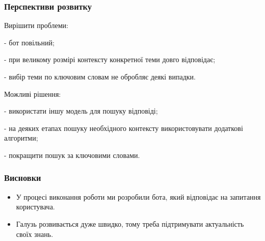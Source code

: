 \documentclass{beamer}
\begin{document}
\begin{frame}
    \frametitle{Перспективи розвитку}
    Вирішити проблеми:

    - бот повільний;

    - при великому розмірі контексту конкретної теми довго відповідає;

    - вибір теми по ключовим словам не обробляє деякі випадки.

    Можливі рішення:
    
    - використати іншу модель для пошуку відповіді;

    - на деяких етапах пошуку необхідного контексту використовувати додаткові алгоритми;

    - покращити пошук за ключовими словами.
\end{frame}

\begin{frame}
    \frametitle{Висновки}

    \begin{itemize}
        \item У процесі виконання роботи ми розробили бота, який відповідає на запитання користувача.
        \item Галузь розвивається дуже швидко, тому треба підтримувати актуальність своїх знань.
    \end{itemize}
    
\end{frame}
\end{document}

